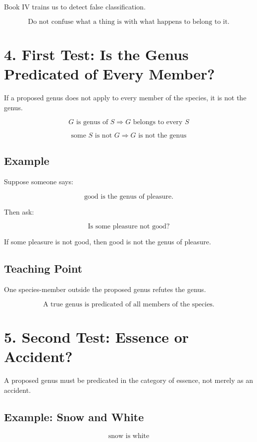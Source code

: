 \documentclass[12pt]{article}
\begin{document}
Book IV trains us to detect false classification.

\[
\boxed{
\text{Do not confuse what a thing is with what happens to belong to it.}
}
\]

\section*{4. First Test: Is the Genus Predicated of Every Member?}

If a proposed genus does not apply to every member of the species, it is not the
genus.

\[
G \text{ is genus of } S
\Rightarrow
G \text{ belongs to every } S
\]

\[
\text{some } S \text{ is not } G
\Rightarrow
G \text{ is not the genus}
\]

\subsection*{Example}

Suppose someone says:

\[
\text{good is the genus of pleasure.}
\]

Then ask:

\[
\text{Is some pleasure not good?}
\]

If some pleasure is not good, then good is not the genus of pleasure.

\subsection*{Teaching Point}

One species-member outside the proposed genus refutes the genus.

\[
\boxed{
\text{A true genus is predicated of all members of the species.}
}
\]

\section*{5. Second Test: Essence or Accident?}

A proposed genus must be predicated in the category of essence, not merely as an
accident.

\subsection*{Example: Snow and White}

\[
\text{snow is white}
\]
\end{document}
